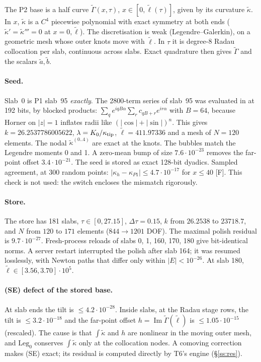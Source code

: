 \documentclass[11pt]{article}
\theoremstyle{definition}
\theoremstyle{remark}
\newcommand{\fn}[1]{\texttt{\detokenize{#1}}}
\newcommand{\tF}{\textnormal{\textsc{[F]}}}
\newcommand{\abs}[1]{\lvert #1\rvert}
\newcommand{\kt}{\tilde\kappa}
\newcommand{\Gt}{\tilde\Gamma}
\newcommand{\lt}{\tilde\ell}
\begin{document}
The P2 base is a half curve $\Gt(x,\tau)$, $x\in[0,\lt(\tau)]$, given by its curvature $\kt$. In $x$, $\kt$ is a $C^4$ piecewise polynomial with exact symmetry at both ends ($\kt'=\kt'''=0$ at $x=0,\lt$). The discretisation is weak (Legendre--Galerkin), on a geometric mesh whose outer knots move with $\lt$. In $\tau$ it is degree-8 Radau collocation per slab, continuous across slabs. Exact quadrature then gives $\Gt$ and the scalars $\tilde a,\tilde b$.

\paragraph{Seed.} Slab~0 is P1 slab~95 \emph{exactly}. The 2800-term series of slab~95 was evaluated in \fn{arb} at 192 bits, by blocked \fn{arb_mat} products: $\sum_qe^{iqB\alpha}\sum_rc_{qB+r}e^{ir\alpha}$ with $B=64$, because Horner on $\abs z=1$ inflates radii like $(\abs{\cos}+\abs{\sin})^n$. This gives $k=26.2537786005622$, $\lambda=K_0/\kappa_{\rm tip}$, $\lt=411.97336$ and a mesh of $N=120$ elements. The nodal $\kt^{(0..4)}$ are exact at the knots. The bubbles match the Legendre moments 0 and 1. A zero-mean bump of size $7.6\cdot10^{-23}$ removes the far-point offset $3.4\cdot10^{-21}$. The seed is stored as exact 128-bit dyadics. Sampled agreement, at 300 random points: $\abs{\kappa_h-\kappa_{P1}}\le4.7\cdot10^{-17}$ for $x\le40$ \tF. This check is not used: the switch encloses the mismatch rigorously.

\paragraph{Store.} The store \fn{polished_v2/} has 181 slabs, $\tau\in[0,27.15]$, $\Delta\tau=0.15$, $k$ from $26.2538$ to $23718.7$, and $N$ from $120$ to $171$ elements ($844\to1201$ DOF). The maximal polish residual is $9.7\cdot10^{-27}$. Fresh-process reloads of slabs 0, 1, 160, 170, 180 give bit-identical norms. A server restart interrupted the polish after slab 164; it was resumed losslessly, with Newton paths that differ only within $\abs E<10^{-26}$. At slab 180, $\lt\in[3.56,3.70]\cdot10^5$.

\paragraph{(SE) defect of the stored base.} At slab ends the tilt is $\le4.2\cdot10^{-28}$. Inside slabs, at the Radau stage rows, the tilt is $\le3.2\cdot10^{-18}$ and the far-point offset $h=\operatorname{Im}\Gt(\lt)$ is $\le1.05\cdot10^{-15}$ (rescaled). The cause is that $\int\kt$ and $h$ are nonlinear in the moving outer mesh, and $\mathrm{Leg}_0$ conserves $\int\kt$ only at the collocation nodes. A comoving correction makes (SE) exact; its residual is computed directly by T6's engine (\S\ref{ss:res}).
\end{document}
